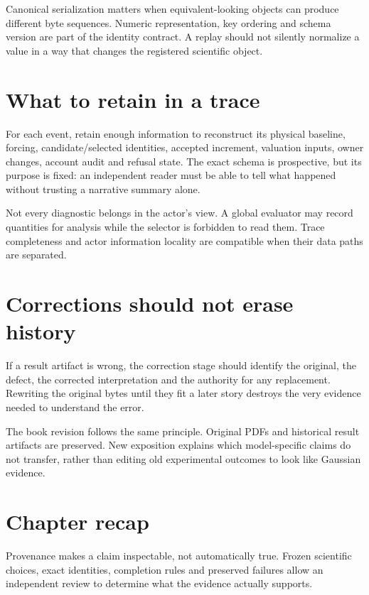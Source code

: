 Canonical serialization matters when equivalent-looking objects can produce
different byte sequences. Numeric representation, key ordering and schema
version are part of the identity contract. A replay should not silently
normalize a value in a way that changes the registered scientific object.

\section{What to retain in a trace}
For each event, retain enough information to reconstruct its physical
baseline, forcing, candidate/selected identities, accepted increment,
valuation inputs, owner changes, account audit and refusal state. The exact
schema is prospective, but its purpose is fixed: an independent reader must
be able to tell what happened without trusting a narrative summary alone.

Not every diagnostic belongs in the actor's view. A global evaluator may
record quantities for analysis while the selector is forbidden to read them.
Trace completeness and actor information locality are compatible when their
data paths are separated.

\section{Corrections should not erase history}
If a result artifact is wrong, the correction stage should identify the
original, the defect, the corrected interpretation and the authority for any
replacement. Rewriting the original bytes until they fit a later story
destroys the very evidence needed to understand the error.

The book revision follows the same principle. Original PDFs and historical
result artifacts are preserved. New exposition explains which model-specific
claims do not transfer, rather than editing old experimental outcomes to
look like Gaussian evidence.

\section*{Chapter recap}
Provenance makes a claim inspectable, not automatically true. Frozen
scientific choices, exact identities, completion rules and preserved failures
allow an independent review to determine what the evidence actually supports.
